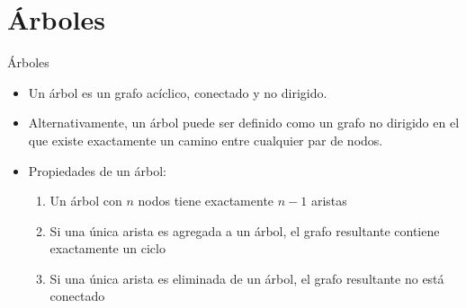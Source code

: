 \documentclass[]{beamer}
\begin{document}
\section{\'Arboles}
\begin{frame}{\'Arboles}
  \begin{itemize}
    \item Un \'arbol es un grafo ac\'iclico, conectado y no dirigido.
      \pause
    \item Alternativamente, un \'arbol puede ser definido como un grafo no dirigido en el que existe exactamente un camino entre cualquier par de nodos.
      \pause
    \item Propiedades de un \'arbol: 
      \begin{enumerate}
        \item Un \'arbol con $n$ nodos tiene exactamente $n-1$ aristas
          \pause
        \item Si una \'unica arista es agregada a un \'arbol, el grafo resultante contiene exactamente un ciclo
          \pause
        \item Si una \'unica arista es eliminada de un \'arbol, el grafo resultante no est\'a conectado
      \end{enumerate}
  \end{itemize}
\end{frame}
\end{document}
